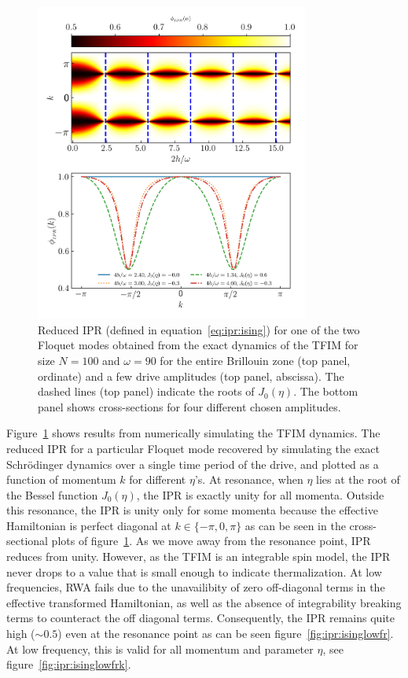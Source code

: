 \documentclass[%
reprint,
superscriptaddress,
amsmath,amssymb,
aps,
prb,
showkeys,
]{revtex4-2}
\begin{document}
	\begin{figure}[hbt!]
		\centering
		\includegraphics[width = 9.0cm]{ising_exact_ipr.jpeg}
		\caption{Reduced IPR (defined in equation~\ref{eq:ipr:ising}) for one of the two Floquet modes obtained from the
			exact dynamics of the TFIM for size $N = 100$ and $\omega=90$ for the entire Brillouin zone (top panel, ordinate) and a few drive amplitudes (top panel, abscissa). The dashed lines (top panel) indicate the roots of $J_0(\eta)$.
			The bottom panel shows cross-sections for four different chosen amplitudes.}
		\label{fig:ipr:tfim}
	\end{figure}
	Figure~\ref{fig:ipr:tfim} shows results from numerically simulating the TFIM dynamics. The reduced IPR for a particular Floquet mode recovered by simulating the exact Schr\"odinger dynamics over a single time period of the drive, and plotted as a function of momentum $k$ for different $\eta$'s. At resonance, when $\eta$ lies at the root of the Bessel function $J_0(\eta)$,  the IPR is exactly unity for all momenta. Outside this resonance, the IPR is unity only for some momenta because the effective Hamiltonian is perfect diagonal at $k \in{\{-\pi, 0, \pi\}}$ as can be seen in the cross-sectional plots of figure~\ref{fig:ipr:tfim}. As we move away from the resonance point, IPR reduces from unity. However, as the TFIM is an integrable spin model, the IPR never drops to a value that is small enough to indicate thermalization. At low frequencies, RWA fails due to the unavailibity of zero off-diagonal terms in the  effective transformed Hamiltonian, as well as the absence of integrability breaking terms to counteract the off diagonal terms. Consequently,  the IPR remains quite high ($\sim 0.5$) even at the resonance point as can be seen figure~\ref{fig:ipr:isinglowfr}. At low frequency, this is valid for all momentum and parameter $\eta$, see figure~\ref{fig:ipr:isinglowfrk}.
	
\end{document}
